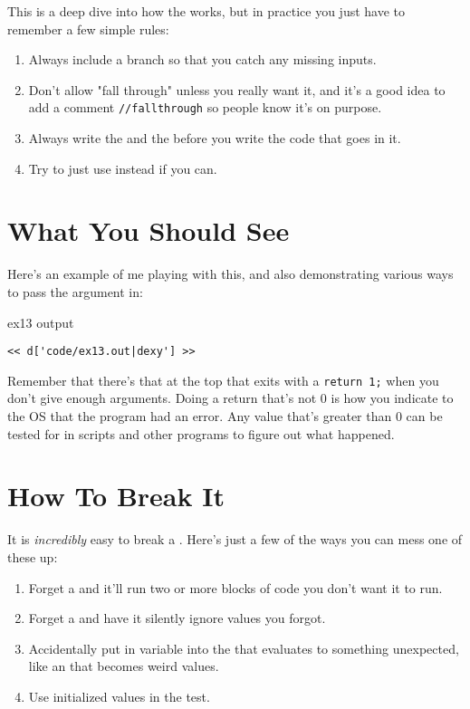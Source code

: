 This is a deep dive into how the  works, but
in practice you just have to remember a few simple rules:

\begin{enumerate}
\item Always include a  branch so that you catch
    any missing inputs.
\item Don't allow "fall through" unless you really want it, and
    it's a good idea to add a comment \verb|//fallthrough| so 
    people know it's on purpose.
\item Always write the  and the  before
    you write the code that goes in it.
\item Try to just use  instead if you can.
\end{enumerate}

\section{What You Should See}

Here's an example of me playing with this, and also demonstrating
various ways to pass the argument in:

\begin{code}{ex13 output}
\begin{lstlisting}
<< d['code/ex13.out|dexy'] >>
\end{lstlisting}
\end{code}

Remember that there's that  at the top that
exits with a \verb|return 1;| when you don't give enough arguments.
Doing a return that's not 0 is how you indicate to the OS that
the program had an error.  Any value that's greater than 0 can be
tested for in scripts and other programs to figure out what
happened.

\section{How To Break It}

It is \emph{incredibly} easy to break a .
Here's just a few of the ways you can mess one of these up:

\begin{enumerate}
\item Forget a  and it'll run two or more
    blocks of code you don't want it to run.
\item Forget a  and have it silently
    ignore values you forgot.
\item Accidentally put in variable into the  that
    evaluates to something unexpected, like an 
    that becomes weird values.
\item Use initialized values in the test.
\end{enumerate}

